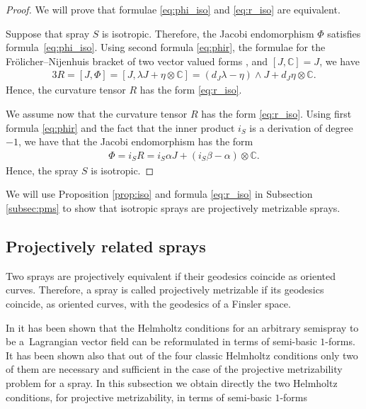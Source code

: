 \documentclass[pdftex]{sigma}
\numberwithin{equation}{section}
\begin{document}
\begin{proof}
We will prove that formulae \eqref{eq:phi_iso} and \eqref{eq:r_iso}
are equivalent.

Suppose that spray $S$ is isotropic. Therefore, the Jacobi endomorphism
$\Phi$ satisf\/ies formu\-la~\eqref{eq:phi_iso}. Using second formula
\eqref{eq:phir}, the formulae for the Fr\"olicher--Nijenhuis bracket of
two vector valued forms \cite[Appendix~A1]{grifone00}, and $[J, \mathbb{C}]=J$, we have
\begin{gather*}
3R=[J,\Phi]=[J, \lambda J + \eta\otimes \mathbb{C}] =
\left(d_J\lambda-\eta\right)\wedge J + d_J\eta \otimes \mathbb{C}. %
\end{gather*} Hence, the curvature tensor $R$ has the form
\eqref{eq:r_iso}.

We assume now that the curvature tensor $R$ has the form
\eqref{eq:r_iso}.  Using f\/irst formula \eqref{eq:phir} and the fact
that the inner product $i_S$ is a derivation of degree $-1$, we have
that the Jacobi endomorphism has the form
\begin{gather*}
\Phi=i_SR=i_S\alpha J + \left(i_S\beta-\alpha\right)\otimes
\mathbb{C}. %
\end{gather*} Hence, the spray $S$ is isotropic.
\end{proof}

We will use  Proposition \ref{prop:iso} and formula \eqref{eq:r_iso} in
Subsection \ref{subsec:pms} to show that isotropic sprays are
projectively metrizable sprays.


\subsection{Projectively related sprays} \label{subsec:prs}

Two sprays are projectively equivalent if their geodesics
coincide as oriented curves. Therefore, a spray is called projectively
metrizable if its geodesics coincide, as oriented curves, with the
geodesics of a Finsler space.

In \cite{bucataru09} it has been shown that the Helmholtz conditions for an
arbitrary semispray to be a~Lag\-rangian vector f\/ield can be
reformulated in terms of semi-basic $1$-forms. It has been shown also
that out of the four classic Helmholtz conditions only two of them are necessary and suf\/f\/icient
in the case of the projective metrizability problem for a spray. In this
subsection we obtain directly the two Helmholtz conditions, for
projective metrizability, in terms of semi-basic $1$-forms
\end{document}
